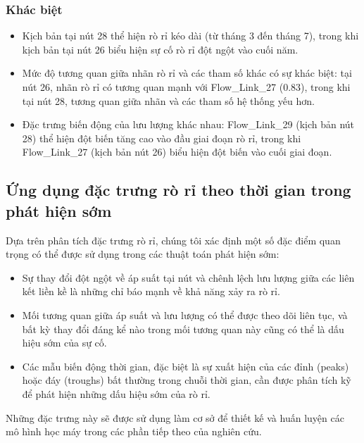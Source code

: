 \subsubsection{Khác biệt}
\begin{itemize}
    \item Kịch bản tại nút 28 thể hiện rò rỉ kéo dài (từ tháng 3 đến tháng 7), trong khi kịch bản tại nút 26 biểu hiện sự cố rò rỉ đột ngột vào cuối năm.
    \item Mức độ tương quan giữa nhãn rò rỉ và các tham số khác có sự khác biệt: tại nút 26, nhãn rò rỉ có tương quan mạnh với Flow\_Link\_27 (0.83), trong khi tại nút 28, tương quan giữa nhãn và các tham số hệ thống yếu hơn.
    \item Đặc trưng biến động của lưu lượng khác nhau: Flow\_Link\_29 (kịch bản nút 28) thể hiện đột biến tăng cao vào đầu giai đoạn rò rỉ, trong khi Flow\_Link\_27 (kịch bản nút 26) biểu hiện đột biến vào cuối giai đoạn.
\end{itemize}

\subsection{Ứng dụng đặc trưng rò rỉ theo thời gian trong phát hiện sớm}

Dựa trên phân tích đặc trưng rò rỉ, chúng tôi xác định một số đặc điểm quan trọng có thể được sử dụng trong các thuật toán phát hiện sớm:

\begin{itemize}
    \item Sự thay đổi đột ngột về áp suất tại nút và chênh lệch lưu lượng giữa các liên kết liền kề là những chỉ báo mạnh về khả năng xảy ra rò rỉ.
    \item Mối tương quan giữa áp suất và lưu lượng có thể được theo dõi liên tục, và bất kỳ thay đổi đáng kể nào trong mối tương quan này cũng có thể là dấu hiệu sớm của sự cố.
    \item Các mẫu biến động thời gian, đặc biệt là sự xuất hiện của các đỉnh (peaks) hoặc đáy (troughs) bất thường trong chuỗi thời gian, cần được phân tích kỹ để phát hiện những dấu hiệu sớm của rò rỉ.
\end{itemize}

Những đặc trưng này sẽ được sử dụng làm cơ sở để thiết kế và huấn luyện các mô hình học máy trong các phần tiếp theo của nghiên cứu.
